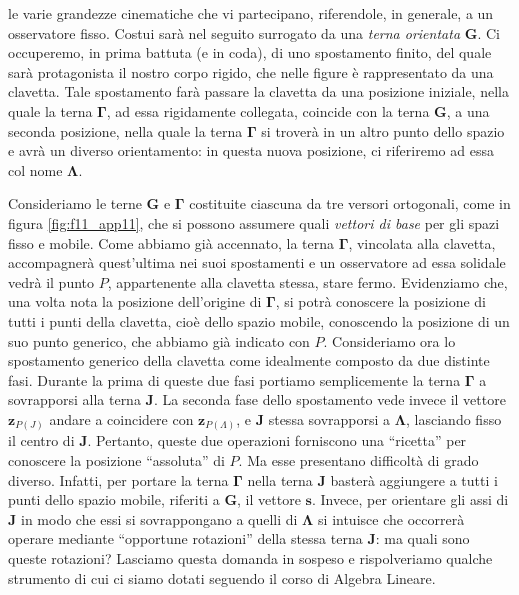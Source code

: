 le varie grandezze cinematiche che vi partecipano,
riferendole, in generale, a un osservatore fisso.
Costui sar\`a nel seguito surrogato
da una {\em terna orientata} 
$\bm{G}$.
Ci occuperemo, in prima battuta (e in coda), di uno spostamento finito,
del quale sar\`a protagonista
il nostro corpo rigido, che nelle figure \`e rappresentato da una clavetta.
Tale spostamento
far\`a passare la clavetta da una posizione iniziale, nella quale
la terna $\bm \Gamma$, ad essa rigidamente collegata, coincide con
la terna $\bm G$, a una seconda posizione,
nella quale la terna $\bm \Gamma$
si trover\`a in un altro punto dello spazio e avr\`a 
un diverso orientamento: in questa nuova posizione, ci riferiremo ad essa
col nome ${\bm \Lambda}$.

\noindent Consideriamo le terne 
$\bm G$
e $\bm \Gamma$
costituite ciascuna 
da tre versori ortogonali, 
come in figura \ref{fig:f11_app11},
che si possono  
assumere quali {\em vettori di base} per
gli spazi fisso e mobile.
Come abbiamo gi\`a accennato, la terna $\bm{ \Gamma}$, vincolata alla clavetta,
accompagner\`a quest'ultima nei suoi spostamenti e un osservatore
ad essa solidale vedr\`a il punto $P$, appartenente alla clavetta stessa, 
stare fermo.
Evidenziamo che, una volta nota la posizione dell'origine di $\bm \Gamma$,
si potr\`a conoscere la posizione di tutti i punti della clavetta, cio\`e
dello spazio mobile,
conoscendo la posizione di un suo punto generico,
che abbiamo gi\`a indicato con $P$. 
Consideriamo ora lo spostamento generico della clavetta
come idealmente composto da due distinte fasi.
Durante la prima di queste due fasi portiamo semplicemente 
la terna $\bm \Gamma$ a sovrapporsi alla terna $\bm J$.
La seconda fase dello spostamento
vede invece il vettore 
${{\bm z}}_{\scriptscriptstyle{P(J)}}$ andare a coincidere con 
${{\bm z}}_{\scriptscriptstyle{P(\Lambda)}}$, e $\bm J$
stessa sovrapporsi a $\bm \Lambda$, lasciando fisso il centro di $\bm J$.
Pertanto, queste due operazioni
forniscono una ``ricetta''
per conoscere la posizione ``assoluta'' di $P$.
Ma esse presentano difficolt\`a di grado diverso.
Infatti, per portare la terna $\bm\Gamma$ nella terna $\bm J$
baster\`a aggiungere a tutti i punti
dello spazio mobile,
riferiti a $\bm G$, il vettore
${\bm{s}}$.  Invece, per orientare gli assi
di $\bm J$ in modo che essi si sovrappongano a quelli
di $\bm \Lambda$ si intuisce che 
occorrer\`a
operare mediante ``opportune rotazioni'' della stessa terna $\bm J$:
ma quali sono queste rotazioni?
Lasciamo questa domanda in sospeso e rispolveriamo qualche strumento
di cui ci siamo dotati
seguendo il corso di Algebra Lineare.  


